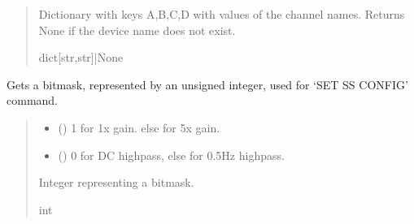 \documentclass[letterpaper,10pt,english]{sphinxmanual}
\begin{document}
\begin{fulllineitems}
\begin{fulllineitems}
\begin{quote}
\begin{description}
\sphinxAtStartPar
Dictionary with keys A,B,C,D with values of the channel names. Returns                 None if the device name does not exist.

\sphinxAtStartPar
dict{[}str,str{]}|None

\end{description}\end{quote}

\end{fulllineitems}


\begin{fulllineitems}
\label{\detokenize{PodDevice_8401HR:PodDevice_8401HR.POD_8401HR.GetSSConfigBitmask_int}}
\pysigstartsignatures
{}
\pysigstopsignatures
\sphinxAtStartPar
Gets a bitmask, represented by an unsigned integer, used for ‘SET SS CONFIG’ command.
\begin{quote}\begin{description}
\begin{itemize}
\item {} 
\sphinxAtStartPar
{} () \textendash{} 1 for 1x gain. else for 5x gain.

\item {} 
\sphinxAtStartPar
{} () \textendash{} 0 for DC highpass, else for 0.5Hz highpass.

\end{itemize}

\sphinxAtStartPar
Integer representing a bitmask.

\sphinxAtStartPar
int

\end{description}\end{quote}

\end{fulllineitems}


\end{fulllineitems}
\end{document}
